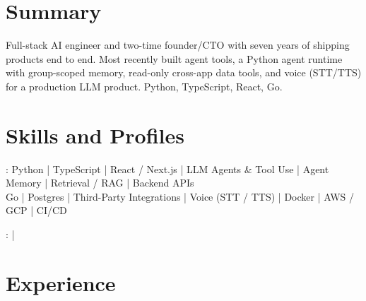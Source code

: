 \documentclass[print]{jack-resume}
\begin{document}
\pagecolor{darkmodeBackground}


\begin{minipage}[t][1cm][t]{.03\textwidth}
    \hfill
\end{minipage}

\section{Summary}
Full-stack AI engineer and two-time founder/CTO with seven years of shipping products end to end. Most recently built agent tools, a Python agent runtime with group-scoped memory, read-only cross-app data tools, and voice (STT/TTS) for a production LLM product. Python, TypeScript, React, Go.
\sectionsep

\section{Skills and Profiles}
:
Python \hfill | \hfill
TypeScript \hfill | \hfill
React / Next.js \hfill | \hfill
LLM Agents \& Tool Use \hfill | \hfill
Agent Memory \hfill | \hfill
Retrieval / RAG \hfill | \hfill
Backend APIs \\
\hspace{1.0cm} Go \hfill | \hfill
Postgres \hfill | \hfill
Third-Party Integrations \hfill | \hfill
Voice (STT / TTS) \hfill | \hfill
Docker \hfill | \hfill
AWS / GCP \hfill | \hfill
CI/CD \\

\raggedright{
    :
      \href{https://www.linkedin.com/in/jack-sturtevant/}{ \ExternalLink} |
     \href{https://github.com/jacksturt}{ \ExternalLink}}

\section{Experience}
\end{document}

